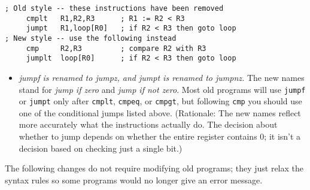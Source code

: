\documentclass[11pt]{article}
\begin{document}
\begin{verbatim}
; Old style -- these instructions have been removed
     cmplt   R1,R2,R3      ; R1 := R2 < R3
     jumpt   R1,loop[R0]   ; if R2 < R3 then goto loop
; New style -- use the following instead
     cmp     R2,R3         ; compare R2 with R3
     jumplt  loop[R0]      ; if R2 < R3 then goto loop
\end{verbatim}

\begin{itemize}
\item \emph{jumpf is renamed to jumpz, and jumpt is renamed to jumpnz.} The new
names stand for \emph{jump if zero} and \emph{jump if not zero}.  Most old
programs will use \texttt{jumpf} or \texttt{jumpt} only after \texttt{cmplt}, \texttt{cmpeq}, or
\texttt{cmpgt}, but following \texttt{cmp} you should use one of the conditional
jumps listed above. (Rationale: The new names reflect more
accurately what the instructions actually do.  The decision about
whether to jump depends on whether the entire register contains 0;
it isn't a decision based on checking just a single bit.)
\end{itemize}

The following changes do not require modifying old programs; they just
relax the syntax rules so some programs would no longer give an error
message.
\end{document}
